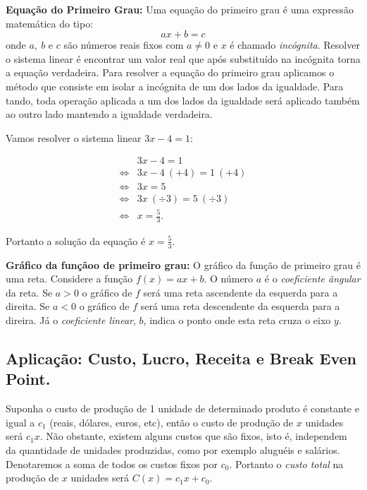 \noindent \textbf{Equação do Primeiro Grau:} Uma equação do primeiro grau é uma expressão matemática do tipo:
$$ax+b=c$$
onde $a,\ b$ e $c$ são números reais fixos com $a \not=0$ e $x$ é chamado  \textit{incógnita}. Resolver o sistema linear é
encontrar um valor real que após substituído na incógnita torna a equação verdadeira. Para resolver a equação do primeiro grau
aplicamos o método que consiste em isolar a incógnita de um dos lados da igualdade.
Para tando, toda operação aplicada a um dos lados da igualdade será aplicado também
ao outro lado mantendo a igualdade verdadeira.
\begin{ex} Vamos resolver o sistema linear $3x-4=1$:

$$\begin{array}{cc}

&3x-4=1\\
\Leftrightarrow& 3x-4 \ (+4)=1\  (+4)\\
\Leftrightarrow& 3x=5\\
\Leftrightarrow& 3x\  (\div 3)=5\  (\div 3)\\
\Leftrightarrow&x=\displaystyle\frac{5}{3}.\end{array}$$

Portanto a solução da equação é $x=\frac{5}{3}.$
\end{ex}

\noindent \textbf{Gráfico da funçãoo de primeiro grau:} O gráfico da função de primeiro grau é
uma reta. Considere a função $f(x)=ax+b$. O número $a$ é o \textit{coeficiente ângular} da reta.
Se $a>0$ o gráfico de $f$ será uma reta
ascendente da esquerda para a direita. Se $a<0$ o gráfico de $f$ será uma reta descendente da esquerda para a direira.
Já o \textit{coeficiente linear}, $b$, indica o ponto onde esta reta cruza o eixo $y$.

\subsection{Aplicação: Custo, Lucro, Receita e Break Even Point.}

Suponha o custo de produção de 1 unidade de determinado produto é constante e igual a $c_1$ (reais, dólares, euros, etc), então o custo de produção de $x$ unidades será $c_1x$. Não obstante, existem alguns custos que são fixos, isto é, independem
da quantidade de unidades produzidas, como por exemplo aluguéis e salários. Denotaremos a soma de todos os custos fixos por $c_0$. Portanto o \textit{custo total} na produção de $x$ unidades
será  $C(x)=c_1x+c_0.$


